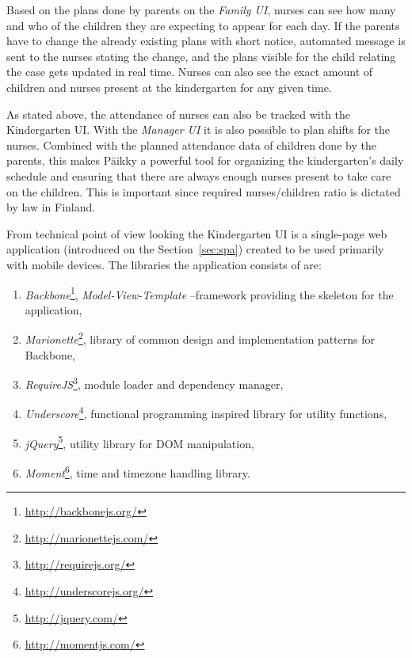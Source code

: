 Based on the plans done by parents on the \textit{Family UI}, nurses can see how many and who of the children they are expecting to appear for each day. If the parents have to change the already existing plans with short notice, automated message is sent to the nurses stating the change, and the plans visible for the child relating the case gets updated in real time. Nurses can also see the exact amount of children and nurses present at the kindergarten for any given time.

As stated above, the attendance of nurses can also be tracked with the Kindergarten UI. With the \textit{Manager UI} it is also possible to plan shifts for the nurses. Combined with the planned attendance data of children done by the parents, this makes Päikky a powerful tool for organizing the kindergarten's daily schedule and ensuring that there are always enough nurses present to take care on the children. This is important since required nurses/children ratio is dictated by law in Finland. %

From technical point of view looking the Kindergarten UI is a single-page web application (introduced on the Section~\ref{sec:spa}) created to be used primarily with mobile devices. The libraries the application consists of are: %

\begin{enumerate}
	\item \textit{Backbone}\footnote{\href{http://backbonejs.org/}{http://backbonejs.org/}}, \textit{Model-View-Template} –framework providing the skeleton for the application,
	\item \textit{Marionette}\footnote{\href{http://marionettejs.com/}{http://marionettejs.com/}}, library of common design and implementation patterns for Backbone,
	\item \textit{RequireJS}\footnote{\href{http://requirejs.org/}{http://requirejs.org/}}, module loader and dependency manager,
	\item \textit{Underscore}\footnote{\href{http://underscorejs.org/}{http://underscorejs.org/}}, functional programming inspired library for utility functions,
	\item \textit{jQuery}\footnote{\href{http://jquery.com/}{http://jquery.com/}}, utility library for DOM manipulation,
	\item \textit{Moment}\footnote{\href{http://momentjs.com/}{http://momentjs.com/}}, time and timezone handling library. 
\end{enumerate}


